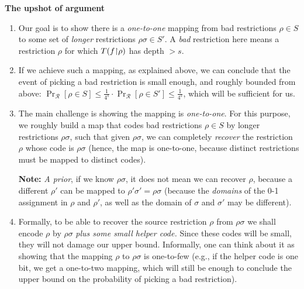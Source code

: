\begin{tcolorbox}[colframe=white, colback=blue!4, boxrule=0mm, sharp corners]
\textbf{The upshot of argument}
\begin{enumerate}
    \item Our goal is to show there is a \emph{one-to-one} mapping from bad restrictions \( \rho \in S \) to some set of  \emph{longer} restrictions \( \rho\sigma\in S' \). 
A \emph{bad} restriction here means a restriction $\rho$ for which \( T(f{\upharpoonright}\rho) \) has depth \( > s \). 
    \item If we achieve such a mapping, as explained above, we can conclude that the event of picking a bad restriction is small enough, and roughly bounded from above: \( \Pr_{\mathcal{R}}[\rho \in S ] \leq \frac{1}{4^s} \cdot \Pr_{\mathcal{R}}[ \rho \in S' ] \le \frac{1}{4^s}\), which will be sufficient for us.   
    \item The main challenge is showing the mapping is \emph{one-to-one}. For this purpose,  we roughly build a map that codes bad restrictions \( \rho \in S \) by longer restrictions \( \rho\sigma \), such that given \( \rho\sigma \), we can completely \emph{recover} the restriction \( \rho \) whose code is \( \rho\sigma \) (hence, the map is one-to-one, because distinct restrictions must be mapped to distinct codes).
    \smallskip 
    
     \textbf{Note:} \emph{A prior}, if we know \( \rho\sigma \), it does not mean we can recover \( \rho \), because a different \( \rho' \) can be mapped to \( \rho'\sigma' = \rho\sigma \) (because the \emph{ domains} of the 0-1 assignment in \( \rho \) and \( \rho' \), as well as the domain of   $\sigma$ and $\sigma'$ may be different).
    
    \item Formally, to be able to recover the source restriction $\rho$ from $\rho\sigma$ we shall encode  \( \rho \) by \( \rho\sigma\) \emph{plus some small helper code.} Since these codes will be small, they will not damage our upper bound. Informally, one can think about it as showing that the mapping $\rho$ to $\rho\sigma$ is one-to-few (e.g., if the helper code is one bit, we get a one-to-two mapping, which will still be enough to conclude the upper bound on the probability of picking a bad restriction). 
    

\end{enumerate}
\end{tcolorbox}
